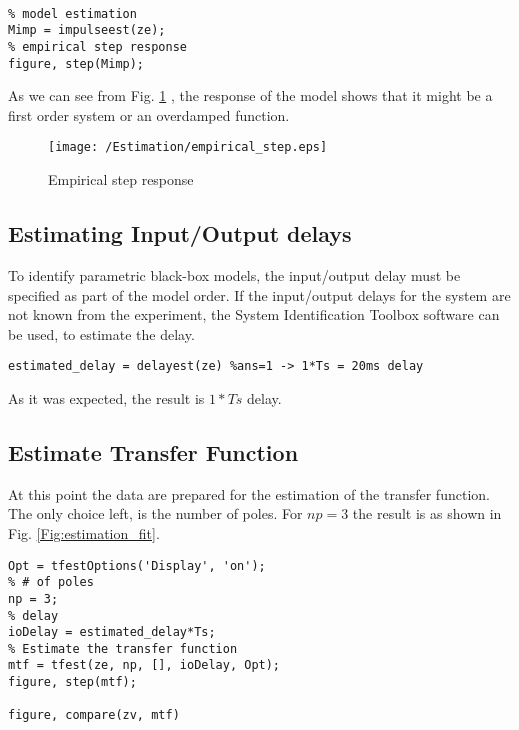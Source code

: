 \begin{lstlisting}[style=My_MATLAB]
%% Estimating the Empirical Step Response

% model estimation
Mimp = impulseest(ze);
% empirical step response
figure, step(Mimp);
\end{lstlisting}

\noindent As we can see from Fig. \ref{Fig:empirical_step} , the response of the model shows that it might be a first order system or an overdamped function.

\begin{figure}[h!]
	\texttt{[image: /Estimation/empirical\_step.eps]}
	\caption{Empirical step response}
	\label{Fig:empirical_step}
\end{figure}





\subsection{Estimating Input/Output delays}

To identify parametric black-box models, the input/output delay must be specified as part of the model order. If the input/output delays for the system are not known from the experiment, the System Identification Toolbox software can be used, to estimate the delay.

\begin{lstlisting}[style=My_MATLAB, caption=Estimation of Input-Output delays]
%Estimate delay
estimated_delay = delayest(ze) %ans=1 -> 1*Ts = 20ms delay
\end{lstlisting}

\noindent As it was expected, the result is $1*Ts$ delay.


\subsection{Estimate Transfer Function}

At this point the data are prepared for the estimation of the transfer function. The only choice left, is the number of poles. For $np = 3$ the result is as shown in Fig. \ref{Fig:estimation_fit}.

\begin{lstlisting}[style=My_MATLAB, caption=Transfer function estimation]
%% ESTIMATE TRANSFER FUNCTION
Opt = tfestOptions('Display', 'on');
% # of poles
np = 3;
% delay
ioDelay = estimated_delay*Ts;
% Estimate the transfer function
mtf = tfest(ze, np, [], ioDelay, Opt);
figure, step(mtf);

figure, compare(zv, mtf)
\end{lstlisting}

